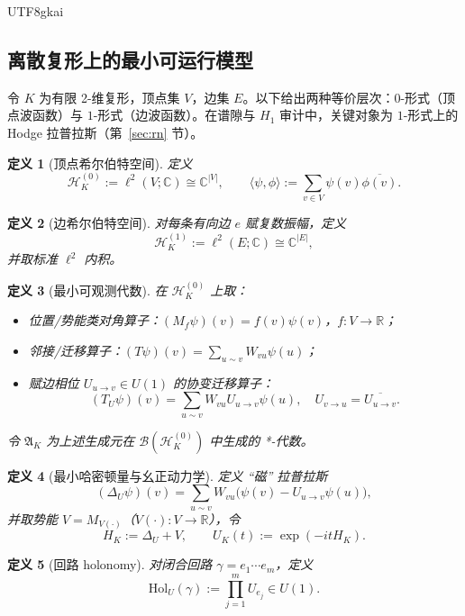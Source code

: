 \documentclass[12pt]{article}
\newtheorem{definition}{定义}[section]
\begin{document}
\begin{CJK*}{UTF8}{gkai}
\subsection{离散复形上的最小可运行模型}

令 $K$ 为有限 2-维复形，顶点集 $V$，边集 $E$。以下给出两种等价层次：$0$-形式（顶点波函数）与 $1$-形式（边波函数）。在谱隙与 $H_1$ 审计中，关键对象为 $1$-形式上的 Hodge
  拉普拉斯（第~\ref{sec:rn} 节）。

\begin{definition}[顶点希尔伯特空间]
\label{def:D10}
定义
\[
\mathcal H^{(0)}_K:=\ell^2(V;\mathbb C)\cong\mathbb C^{|V|},
\qquad
\langle\psi,\phi\rangle:=\sum_{v\in V}\psi(v)\overline{\phi(v)}.
\]
\end{definition}

\begin{definition}[边希尔伯特空间]
\label{def:D11}
对每条有向边 $e$ 赋复数振幅，定义
\[
\mathcal H^{(1)}_K:=\ell^2(E;\mathbb C)\cong\mathbb C^{|E|},
\]
并取标准 $\ell^2$ 内积。
\end{definition}

\begin{definition}[最小可观测代数]
\label{def:D12}
在 $\mathcal H^{(0)}_K$ 上取：
\begin{itemize}
\item 位置/势能类对角算子：$(M_f\psi)(v)=f(v)\psi(v)$，$f:V\to\mathbb R$；
\item 邻接/迁移算子：$(T\psi)(v)=\sum_{u\sim v}W_{vu}\psi(u)$；
\item 赋边相位 $U_{u\to v}\in U(1)$ 的协变迁移算子：
\[
(T_U\psi)(v)=\sum_{u\sim v}W_{vu}U_{u\to v}\psi(u),\quad U_{v\to u}=\overline{U_{u\to v}}.
\]
\end{itemize}
令 $\mathfrak A_K$ 为上述生成元在 $\mathcal B(\mathcal H^{(0)}_K)$ 中生成的 *-代数。
\end{definition}

\begin{definition}[最小哈密顿量与幺正动力学]
\label{def:D13}
定义 ``磁'' 拉普拉斯
\[
(\Delta_U\psi)(v)=\sum_{u\sim v}W_{vu}\big(\psi(v)-U_{u\to v}\psi(u)\big),
\]
并取势能 $V=M_{V(\cdot)}$（$V(\cdot):V\to\mathbb R$），令
\[
H_K:=\Delta_U+V,
\qquad
U_K(t):=\exp(-itH_K).
\]
\end{definition}

\begin{definition}[回路 holonomy]
\label{def:D14}
对闭合回路 $\gamma=e_1\cdots e_m$，定义
\[
\mathrm{Hol}_U(\gamma):=\prod_{j=1}^m U_{e_j}\in U(1).
\]
\end{definition}


\end{CJK*}
\end{document}
